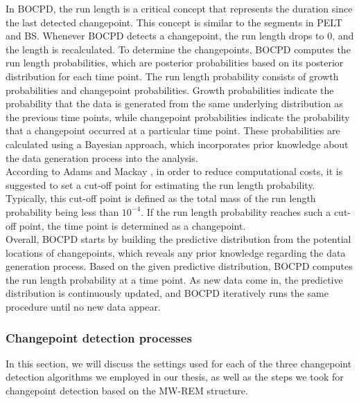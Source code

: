 \documentclass[]{interact}
\theoremstyle{plain}%
\theoremstyle{definition}
\theoremstyle{remark}
\begin{document}
	In BOCPD, the run length is a critical concept that represents the duration since the last detected changepoint. This concept is similar to the segments in PELT and BS. Whenever BOCPD detects a changepoint, the run length drops to 0, and the length is recalculated. To determine the changepoints, BOCPD computes the run length probabilities, which are posterior probabilities based on its posterior distribution for each time point. The run length probability consists of growth probabilities and changepoint probabilities. Growth probabilities indicate the probability that the data is generated from the same underlying distribution as the previous time points, while changepoint probabilities indicate the probability that a changepoint occurred at a particular time point. These probabilities are calculated using a Bayesian approach, which incorporates prior knowledge about the data generation process into the analysis. \\
	
	According to Adams and Mackay \cite{adamsBayesianOnlineChangepoint2007}, in order to reduce computational costs, it is suggested to set a cut-off point for estimating the run length probability. Typically, this cut-off point is defined as the total mass of the run length probability being less than $10^{-4}$. If the run length probability reaches such a cut-off point, the time point is determined as a changepoint. \\
	
	Overall, BOCPD starts by building the predictive distribution from the potential locations of changepoints, which reveals any prior knowledge regarding the data generation process. Based on the given predictive distribution, BOCPD computes the run length probability at a time point. As new data come in, the predictive distribution is continuously updated, and BOCPD iteratively runs the same procedure until no new data appear.
	
	\subsubsection{Changepoint detection processes} \label{sec:our method}
	
	\hspace{0.27cm} In this section, we will discuss the settings used for each of the three changepoint detection algorithms we employed in our thesis, as well as the steps we took for changepoint detection based on the MW-REM structure. \\
	
\end{document}
